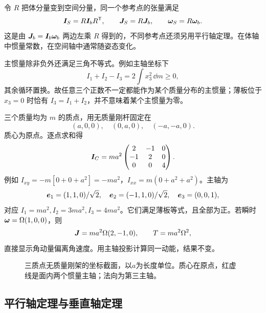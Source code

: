 令 $R$ 把体分量变到空间分量，同一个参考点的张量满足
\begin{equation}
\boldsymbol{I}_S=R\boldsymbol{I}_bR^{\mathsf T},\qquad
\boldsymbol{J}_S=R\boldsymbol{J}_b,\qquad \boldsymbol{\omega}_S=R\boldsymbol{\omega}_b.
\label{eq:rigid-inertia-transform}
\end{equation}
这是由 $\boldsymbol{J}_b=\boldsymbol{I}_b\boldsymbol{\omega}_b$ 两边左乘 $R$ 得到的，不同参考点还须另用平行轴定理。在体轴中惯量常数，在空间轴中通常随姿态变化。

主惯量除非负外还满足三角不等式。例如主轴坐标下
\[
I_1+I_2-I_3=2\int x_3^2\,\dd m\ge0,
\]
其余循环置换。故任意三个正数不一定都能作为某个质量分布的主惯量；薄板位于 $x_3=0$ 时恰有 $I_3=I_1+I_2$，并不意味着某个主惯量为零。

\begin{example}[带惯量积的三质点刚架]
三个质量均为 $m$ 的质点，用无质量刚杆固定在
\[
(a,0,0),\quad(0,a,0),\quad(-a,-a,0).
\]
质心为原点。逐点求和得
\[
\boldsymbol{I}_C=ma^2\begin{pmatrix}2&-1&0\\-1&2&0\\0&0&4\end{pmatrix}.
\]
例如 $I_{xy}=-m[0+0+a^2]=-ma^2$，$I_{xx}=m(0+a^2+a^2)$。主轴为
\[
\boldsymbol{e}_1=(1,1,0)/\sqrt2,\quad\boldsymbol{e}_2=(-1,1,0)/\sqrt2,\quad\boldsymbol{e}_3=(0,0,1),
\]
对应 $I_1=ma^2,I_2=3ma^2,I_3=4ma^2$。它们满足薄板等式，且全部为正。若瞬时 $\boldsymbol{\omega}=\Omega(1,0,0)$，则
\[
\boldsymbol{J}=ma^2\Omega(2,-1,0),\qquad T=ma^2\Omega^2,
\]
直接显示角动量偏离角速度。用主轴投影计算同一动能，结果不变。
\end{example}


\begin{figure}[htbp]
\centering
{}
\caption{三质点无质量刚架的坐标截面，以$a$为长度单位。质心在原点，红虚线是面内两个惯量主轴；法向为第三主轴。}
\label{fig:rigid-frame}
\end{figure}

\subsection{平行轴定理与垂直轴定理}

